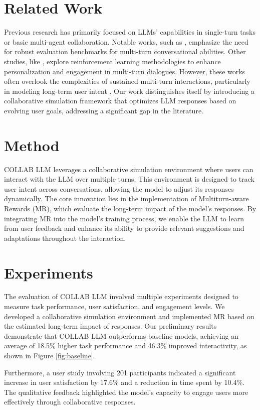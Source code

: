 \documentclass{article} %
\begin{document}
\section{Related Work}
\label{sec:related}
Previous research has primarily focused on LLMs' capabilities in single-turn tasks or basic multi-agent collaboration. Notable works, such as \citep{kwan2024mtevalam}, emphasize the need for robust evaluation benchmarks for multi-turn conversational abilities. Other studies, like \citep{wan2025enhancingpm}, explore reinforcement learning methodologies to enhance personalization and engagement in multi-turn dialogues. However, these works often overlook the complexities of sustained multi-turn interactions, particularly in modeling long-term user intent \citep{fan2024fairmtbenchbf}. Our work distinguishes itself by introducing a collaborative simulation framework that optimizes LLM responses based on evolving user goals, addressing a significant gap in the literature.

\section{Method}
\label{sec:method}
COLLAB LLM leverages a collaborative simulation environment where users can interact with the LLM over multiple turns. This environment is designed to track user intent across conversations, allowing the model to adjust its responses dynamically. The core innovation lies in the implementation of Multiturn-aware Rewards (MR), which evaluate the long-term impact of the model's responses. By integrating MR into the model's training process, we enable the LLM to learn from user feedback and enhance its ability to provide relevant suggestions and adaptations throughout the interaction.

\section{Experiments}
\label{sec:experiments}
The evaluation of COLLAB LLM involved multiple experiments designed to measure task performance, user satisfaction, and engagement levels. We developed a collaborative simulation environment and implemented MR based on the estimated long-term impact of responses. Our preliminary results demonstrate that COLLAB LLM outperforms baseline models, achieving an average of 18.5\% higher task performance and 46.3\% improved interactivity, as shown in Figure \ref{fig:baseline}.

Furthermore, a user study involving 201 participants indicated a significant increase in user satisfaction by 17.6\% and a reduction in time spent by 10.4\%. The qualitative feedback highlighted the model's capacity to engage users more effectively through collaborative responses.
\end{document}
